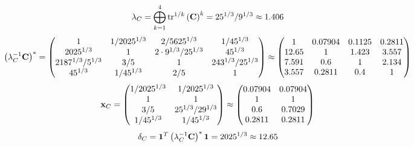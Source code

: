 \documentclass[10pt,a4paper]{article}
\begin{document}
	\[
		\lambda_{C} =  \bigoplus ^{4} _{k = 1} \operatorname{tr} ^{1 / k} \left( \bold{C} \right)^k = {{25^ {1 / 3}}} / {{9^ {1 / 3}}}\approx 1.406
	\]
	\[
		\left(\lambda_{C}^{-1}\bold{C}\right)^* = 
		\begin{pmatrix}
			{1}{} & {1} / {{2025^ {1 / 3}}} & {{2}} / {{5625^ {1 / 3}}} & {1} / {{45^ {1 / 3}}} \\
			{{2025^ {1 / 3}}}{} & {1}{} & {{2} \cdot {9^ {1 / 3}}} / {{25^ {1 / 3}}} & {{45^ {1 / 3}}}{} \\
			{{2187^ {1 / 3}}} / {{5^ {1 / 3}}} & {{3}} / {{5}} & {1}{} & {{243^ {1 / 3}}} / {{25^ {1 / 3}}} \\
			{{45^ {1 / 3}}}{} & {1} / {{45^ {1 / 3}}} & {{2}} / {{5}} & {1}{} \\
		\end{pmatrix}
		\approx
		\begin{pmatrix}
			1        & 0.07904  & 0.1125   & 0.2811   \\
			12.65    & 1        & 1.423    & 3.557    \\
			7.591    & 0.6      & 1        & 2.134    \\
			3.557    & 0.2811   & 0.4      & 1        \\
		\end{pmatrix}
	\]
	\[
		\bold{x}_{C} = 
		\begin{pmatrix}
			{1} / {{2025^ {1 / 3}}} & {1} / {{2025^ {1 / 3}}} \\
			{1}{} & {1}{} \\
			{{3}} / {{5}} & {{25^ {1 / 3}}} / {{2}{9^ {1 / 3}}} \\
			{1} / {{45^ {1 / 3}}} & {1} / {{45^ {1 / 3}}} \\
		\end{pmatrix}
		\approx
		\begin{pmatrix}
			0.07904  & 0.07904  \\
			1        & 1        \\
			0.6      & 0.7029   \\
			0.2811   & 0.2811   \\
		\end{pmatrix}
	\]
	\[
		\delta_{C} = \bold{1}^T \left(\lambda_{C}^{-1}\bold{C}\right)^* \bold{1} = {{2025^ {1 / 3}}}{}\approx 12.65
	\]
\end{document}
